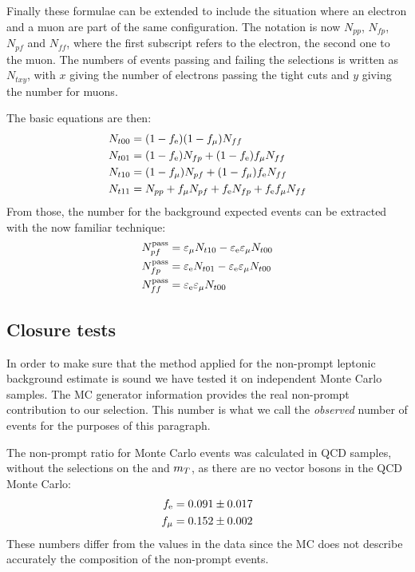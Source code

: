 Finally these formulae can be extended to include the situation where an
electron and a muon are part of the same configuration.
The notation is now $N_{pp}$, $N_{fp}$, $N_{pf}$ and $N_{ff}$, where the
first subscript refers to the electron, the second one to the muon. The
numbers of events passing and failing the selections is written as
$N_{txy}$, with $x$ giving the number of electrons passing the tight cuts
and $y$ giving the number for muons.

The basic equations are then:
\begin{align*}
    N_{t00} &= (1 - f_{\mathrm{e}})(1 - f_{\mu}) N_{ff}\\
    N_{t01} &= (1 - f_{\mathrm{e}})N_{fp} + (1 - f_{\mathrm{e}})f_{\mu} N_{ff}\\
    N_{t10} &= (1 - f_{\mu})N_{pf} + (1 - f_{\mu})f_{\mathrm{e}} N_{ff}\\
    N_{t11} &= N_{pp} + f_{\mu} N_{pf} + f_{\mathrm{e}} N_{fp} + f_{\mathrm{e}} f_{\mu} N_{ff}
\end{align*}
From those, the number for the background expected events can be extracted with the
now familiar technique:
\begin{align*}
    N_{pf}^\text{pass} &= \varepsilon_{\mu} N_{t10} - \varepsilon_{\mathrm{e}}
    \varepsilon_{\mu} N_{t00}\\
    N_{fp}^\text{pass} &= \varepsilon_{\mathrm{e}} N_{t01} -
    \varepsilon_{\mathrm{e}} \varepsilon_{\mu} N_{t00}\\
    N_{ff}^\text{pass} &= \varepsilon_{\mathrm{e}} \varepsilon_{\mu} N_{t00}
\end{align*}

\subsection{Closure tests}\label{sec:closure}
In order to make sure that the method applied for the non-prompt leptonic
background estimate is sound we have tested it on independent Monte Carlo
samples. The MC generator information provides the real non-prompt
contribution to our selection. This number is what we call the
\emph{observed} number of events for the purposes of this paragraph.

The non-prompt ratio for Monte Carlo events was calculated 
in QCD samples, without the selections on the
\met and $m_T$,  as there are no vector bosons in the QCD Monte Carlo:
\begin{align*}
    f_{\mathrm{e}} &= 0.091 \pm 0.017\\
    f_{\mu} &= 0.152 \pm 0.002
\end{align*}
These numbers differ from the values in the data since the MC does not
describe accurately the composition of the non-prompt events.

